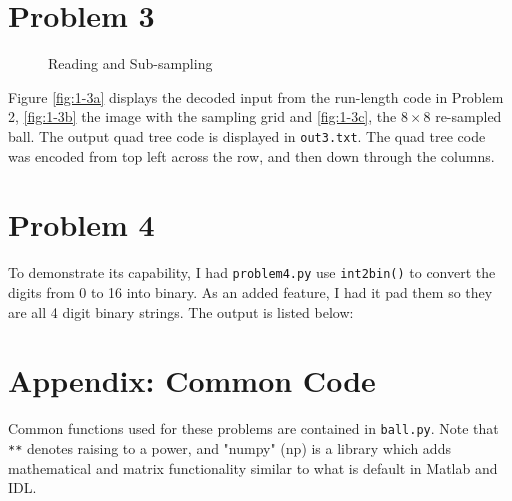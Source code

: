 \documentclass[aps,letterpaper,10pt]{article}
\begin{document}
\section{Problem 3}
\begin{figure}[!h]
\centering
{}\hfill
{}\hfill
{}
\caption{Reading and Sub-sampling}
\label{1-3}
\end{figure}
Figure \ref{fig:1-3a} displays the decoded input from the run-length code in Problem 2, \ref{fig:1-3b} the image with the sampling grid and \ref{fig:1-3c}, the $8\times8$ re-sampled ball.  The output quad tree code is displayed in \texttt{out3.txt}.  The quad tree code was encoded from top left across the row, and then down through the columns.




\newpage
\section{Problem 4}
To demonstrate its capability, I had \texttt{problem4.py} use \texttt{int2bin()} to convert the digits from 0 to 16 into binary.  As an added feature, I had it pad them so they are all 4 digit binary strings.  The output is listed below:



\newpage
\section{Appendix: Common Code}
Common functions used for these problems are contained in \texttt{ball.py}.  Note that \texttt{**} denotes raising to a power, and "numpy" (np) is a library which adds mathematical and matrix functionality similar to what is default in Matlab and IDL.

\end{document}

